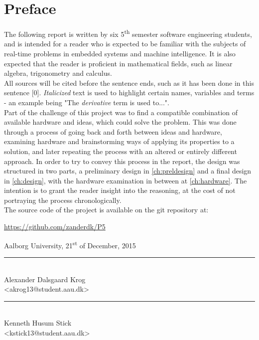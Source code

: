 \chapter*{Preface}\label{ch:preface}
The following report is written by six 5\textsuperscript{th} semester software engineering students, and is intended for a reader who is expected to be familiar with the subjects of real-time problems in embedded systems and machine intelligence. It is also expected that the reader is proficient in mathematical fields, such as linear algebra, trigonometry and calculus. \\

All sources will be cited before the sentence ends, such as it has been done in this sentence [0]. \emph{Italicized} text is used to highlight certain names, variables and terms - an example being "The \emph{derivative} term is used to...". \\

Part of the challenge of this project was to find a compatible combination of available hardware and ideas, which could solve the problem. This was done through a process of going back and forth between ideas and hardware, examining hardware and brainstorming ways of applying its properties to a solution, and later repeating the process with an altered or entirely different approach. In order to try to convey this process in the report, the design was structured in two parts, a preliminary design in \cref{ch:preldesign} and a final design in \cref{ch:design}, with the hardware examination in between at \cref{ch:hardware}. The intention is to grant the reader insight into the reasoning, at the cost of not portraying the process chronologically.\\

The source code of the project is available on the git repository at:
\begin{center}
\url{https://github.com/zanderdk/P5}
\end{center}
\hfill Aalborg University, 21\textsuperscript{st} of December, 2015
\vfill
\vspace{10mm}

\noindent
\begin{minipage}[b]{0.45\textwidth}
 \centering
 \rule{\textwidth}{0.5pt}\\
  Alexander Dalsgaard Krog\\
 {\footnotesize <akrog13@student.aau.dk>}
\end{minipage}
%
\hfill
%
\begin{minipage}[b]{0.45\textwidth}
 \centering
 \rule{\textwidth}{0.5pt}\\
 Kenneth Husum Stick\\
 {\footnotesize <kstick13@student.aau.dk>}
\end{minipage}
%
\vspace{3\baselineskip}

